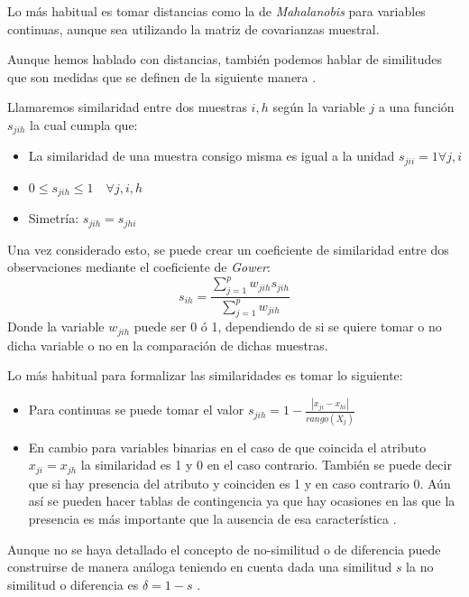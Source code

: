 \noindent Lo más habitual es tomar distancias como la de \emph{Mahalanobis} para variables continuas, aunque sea utilizando la matriz de covarianzas muestral. 

\noindent Aunque hemos hablado con distancias, también podemos hablar de similitudes que son medidas que se definen de la siguiente manera \cite{Peña 2002}.

\begin{defi}
Llamaremos similaridad entre dos muestras $i,h$ según la variable $j$ a una función $s_{jih}$ la cual cumpla que:
\begin{itemize}
\item La similaridad de una muestra consigo misma es igual a la unidad $s_{jii}=1 \forall j,i$
\item $0\leq s_{jih} \leq 1\quad \forall j,i,h $
\item Simetría: $s_{jih}=s_{jhi}$
\end{itemize}
\end{defi}

\noindent Una vez considerado esto, se puede crear un coeficiente de similaridad entre dos observaciones mediante el coeficiente de \emph{Gower}\cite{Peña 2002}:
\begin{equation}
s_{ih}=\dfrac{\sum_{j=1}^{p}w_{jih}s_{jih}}{\sum_{j=1}^{p}w_{jih}}
\end{equation}
\noindent Donde la variable $w_{jih}$ puede ser 0 ó 1, dependiendo de si se quiere tomar o no dicha variable o no en la comparación de dichas muestras. 

\noindent Lo más habitual para formalizar las similaridades es tomar lo siguiente:
\begin{itemize}
\item Para continuas se puede tomar el valor $s_{jih}=1-\frac{|x_{ji}-x_{hi}|}{rango(X_j)}$
\item En cambio para variables binarias en el caso de que coincida el atributo $x_{ji}=x_{jh}$ la similaridad es 1 y 0 en el caso contrario. También se puede decir que si hay presencia del atributo y coinciden es 1 y en caso contrario 0. Aún así se pueden hacer tablas de contingencia ya que hay ocasiones en las que la presencia es más importante que la ausencia de esa característica \cite{Johnson 2007}.
\end{itemize}

\noindent Aunque no se haya detallado el concepto de no-similitud o de diferencia puede construirse de manera análoga teniendo en cuenta dada una similitud $s$ la no similitud o diferencia es $\delta=1-s$ \cite{Everitt 2011}.
 
